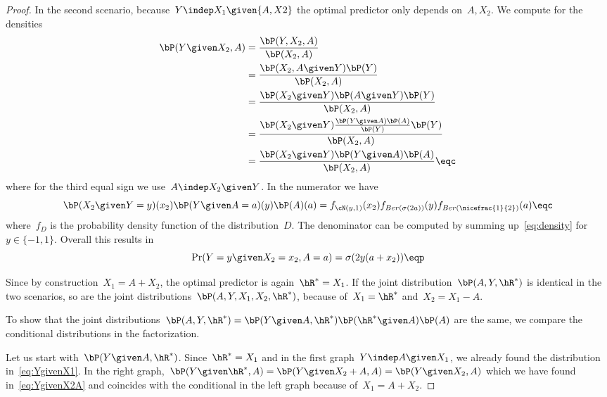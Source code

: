 \begin{proof}
  In the second scenario, because~$Y \indep X_1 \given \{A, X2\}$ the optimal
  predictor only depends on~$A, X_2$. We compute for the densities
  \begin{subequations}\label{eq:YgivenX2A}
    \begin{align}
      \bP(Y \given X_2, A) & = \frac{\bP(Y, X_2, A)}{\bP(X_2, A)} \\
      &= \frac{\bP(X_2, A \given Y) \bP(Y)}{\bP(X_2, A)} \\
      &= \frac{\bP(X_2 \given Y) \bP(A \given Y)
        \bP(Y)}{\bP(X_2, A)} \\
      &= \frac{\bP(X_2 \given Y) \frac{\bP(Y \given A)
        \bP(A)}{\bP(Y)} \bP(Y)}{\bP(X_2, A)} \\
      &= \frac{\bP(X_2 \given Y) \bP(Y \given A) \bP(A)}
        {\bP(X_2, A)} \eqc
    \end{align}
  \end{subequations}
  where for the third equal sign we use~$A \indep X_2 \given Y$. In the
  numerator we have
  \begin{equation}\label{eq:density}
    \bP(X_2 \given Y=y)(x_2) \bP(Y \given A=a)(y) \bP(A)(a)
    = f_{\cN(y,1)}(x_2) f_{Ber(\sigma(2 a))}(y) f_{Ber(\nicefrac{1}{2})}(a)\eqc
  \end{equation}
  where~$f_{D}$ is the probability density function of the distribution~$D$.
  The denominator can be computed by summing up~\eqref{eq:density} for~$y\in
  \{-1,1\}$. Overall this results in
  \begin{equation*}
    \Pr(Y = y \given X_2 = x_2, A=a) = \sigma(2 y (a + x_2)) \eqp
  \end{equation*}

  Since by construction~$X_1 = A + X_2$, the optimal predictor is again~$\hR^* =
  X_1$. If the joint distribution~$\bP(A, Y, \hR^*)$ is identical in the two
  scenarios, so are the joint distributions~$\bP(A, Y, X_1, X_2, \hR^*)$,
  because of~$X_1 = \hR^*$ and~$X_2 = X_1 - A$.

  To show that the joint distributions~$\bP(A, Y, \hR^*) = \bP(Y \given A,
  \hR^*) \bP(\hR^* \given A) \bP(A)$ are the same, we compare the conditional
  distributions in the factorization.

  Let us start with~$\bP(Y \given A, \hR^*)$.  Since~$\hR^* = X_1$ and in the
  first graph~$Y \indep A \given X_1$, we already found the distribution
  in~\eqref{eq:YgivenX1}. In the right graph,~$\bP(Y \given \hR^*, A) = \bP(Y
  \given X_2 + A, A) = \bP(Y \given X_2, A)$ which we have found
  in~\eqref{eq:YgivenX2A} and coincides with the conditional in the left graph
  because of~$X_1 = A + X_2$.


\end{proof}
